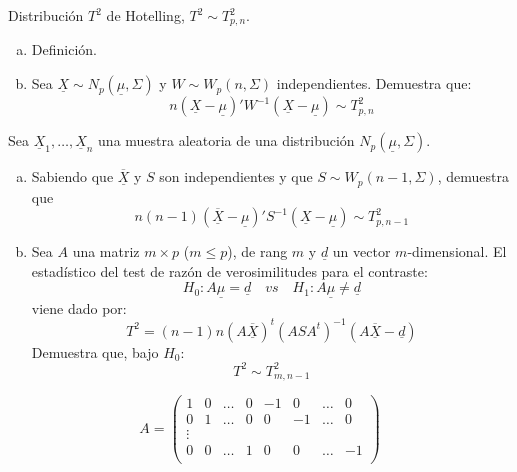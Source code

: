 \documentclass[twoside]{article}
\newcommand{\media}[1]{{\overline{#1}}}
\newcommand{\muestra}[1]{{\underline{#1}}}
\newcommand{\m}[1]{{\muestra{#1}}}
\newcommand{\mX}{{\muestra{X}}}
\begin{document}
\newpage

\begin{ejercicio}{1.4}
Distribución $T^2$ de Hotelling, $T^2 \sim T^2_{p,n}$.
\begin{enumerate}[(a)]
\item Definición.
\item Sea $\mX \sim N_p(\m{μ},Σ)$ y $W \sim W_p(n,Σ)$ independientes. Demuestra que:
\[ n(\mX-\m{μ})' W^{-1} (\mX-\m{μ}) \sim T^2_{p,n} \]
\end{enumerate}
\end{ejercicio}

\newpage

\begin{ejercicio}{1.5}
Sea $\mX_1,\dots,\mX_n$ una muestra aleatoria de una distribución $N_p(\m{μ},Σ)$.
\begin{enumerate}[(a)]
\item Sabiendo que $\media{\mX}$ y $S$ son independientes y que $S \sim W_p(n-1,Σ)$, demuestra que
\[ n(n-1)(\media{\mX}-\m{μ})' S^{-1} (\mX-\m{μ}) \sim T^2_{p,n-1}\]
\item Sea $A$ una matriz $m\times p$ ($m≤p$), de rang $m$ y $\m{d}$ un vector $m$-dimensional.
El estadístico del test de razón de verosimilitudes para el contraste:
\[ H_0 \colon A\m{μ} = \m{d} \quad vs \quad H_1 \colon A\m{μ} \neq \m{d} \]
viene dado por:
\[ T^2 = (n-1)n (A\media{\mX})^t (ASA^t)^{-1} (A \media{\mX}-\m{d}) \]
Demuestra que, bajo $H_0$:
\[ T^2 \sim T^2_{m,n-1} \]
\end{enumerate}
\end{ejercicio}

\newpage

\[ A = \begin{pmatrix} 1 & 0 & \dots & 0& -1 & 0 & \dots & 0\\
 0 & 1 & \dots & 0 & 0 & -1 & \dots & 0\\
 \vdots\\
  0 & 0 & \dots & 1 & 0 & 0 & \dots & -1\\\end{pmatrix} \]
\end{document}
